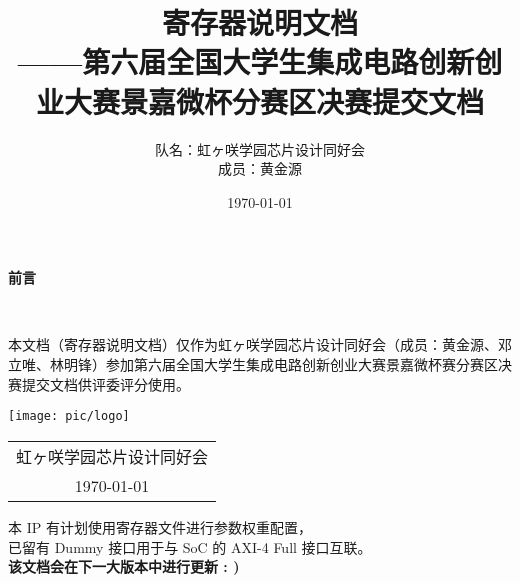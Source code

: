 \documentclass[12pt, a4paper, oneside]{ctexbook}
\title{{\Huge{\textbf{寄存器说明文档}}}\normalsize{\\——第六届全国大学生集成电路创新创业大赛景嘉微杯分赛区决赛提交文档}}
\author{队名：虹ヶ咲学园芯片设计同好会\\ 成员：黄金源\space邓立唯\space林明锋}
\date{\today}
\begin{document}
	
	\maketitle	
	\setcounter{page}{1}
	\begin{center}
		\Huge\textbf{前言}
	\end{center}~\
	
	本文档（寄存器说明文档）仅作为虹ヶ咲学园芯片设计同好会（成员：黄金源、邓立唯、林明锋）参加第六届全国大学生集成电路创新创业大赛景嘉微杯赛分赛区决赛提交文档供评委评分使用。
	~\\
	\begin{flushright}
		\texttt{[image: pic/logo]}\\
		\begin{tabular}{c}
			虹ヶ咲学园芯片设计同好会\\
			\today
		\end{tabular}
	\end{flushright}
	
	\newpage
	\begin{center}
		本 IP 有计划使用寄存器文件进行参数权重配置，\\
		已留有 Dummy 接口用于与 SoC 的 AXI-4 Full 接口互联。\\
		\textbf{该文档会在下一大版本中进行更新 : )}
	\end{center}
\end{document}
